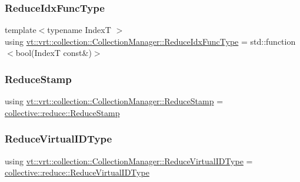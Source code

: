 \subsubsection{\texorpdfstring{Reduce\+Idx\+Func\+Type}{ReduceIdxFuncType}}
{\footnotesize\ttfamily template$<$typename IndexT $>$ \\
using \hyperlink{structvt_1_1vrt_1_1collection_1_1_collection_manager_a47a3227ae0195c15187e8dc8762f66c4}{vt\+::vrt\+::collection\+::\+Collection\+Manager\+::\+Reduce\+Idx\+Func\+Type} =  std\+::function$<$bool(IndexT const\&)$>$}

\mbox{\label{structvt_1_1vrt_1_1collection_1_1_collection_manager_ae8aac19e0ae07e9225142e5880eac830}} 
\subsubsection{\texorpdfstring{Reduce\+Stamp}{ReduceStamp}}
{\footnotesize\ttfamily using \hyperlink{structvt_1_1vrt_1_1collection_1_1_collection_manager_ae8aac19e0ae07e9225142e5880eac830}{vt\+::vrt\+::collection\+::\+Collection\+Manager\+::\+Reduce\+Stamp} =  \hyperlink{namespacevt_1_1collective_1_1reduce_a7b7cb3021ac5654d92825d9fab0250b2}{collective\+::reduce\+::\+Reduce\+Stamp}}

\mbox{\label{structvt_1_1vrt_1_1collection_1_1_collection_manager_ae820c8c22ae8c7350fa0232e0749b097}} 
\subsubsection{\texorpdfstring{Reduce\+Virtual\+I\+D\+Type}{ReduceVirtualIDType}}
{\footnotesize\ttfamily using \hyperlink{structvt_1_1vrt_1_1collection_1_1_collection_manager_ae820c8c22ae8c7350fa0232e0749b097}{vt\+::vrt\+::collection\+::\+Collection\+Manager\+::\+Reduce\+Virtual\+I\+D\+Type} =  \hyperlink{namespacevt_1_1collective_1_1reduce_a6d4ad09f8584c3ec79f46944eb773376}{collective\+::reduce\+::\+Reduce\+Virtual\+I\+D\+Type}}

